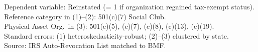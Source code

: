 \begin{table}[htbp]
   \par \raggedright 
   Dependent variable: Reinstated (= 1 if organization regained tax-exempt status).\\
   Reference category in (1)--(2): 501(c)(7) Social Club.\\
   Physical Asset Org.~in (3): 501(c)(5), (c)(7), (c)(8), (c)(13), (c)(19).\\
   Standard errors: (1) heteroskedasticity-robust; (2)--(3) clustered by state.\\
   Source: IRS Auto-Revocation List matched to BMF.
\end{table}


